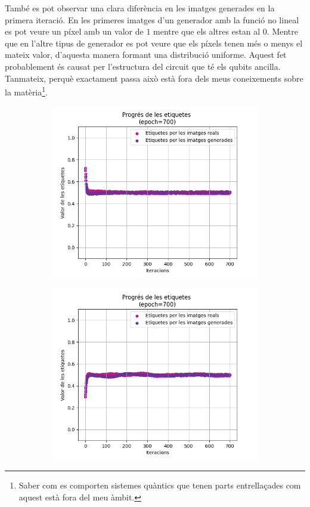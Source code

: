També es pot observar una clara diferència en les imatges generades en la primera iteració. En les primeres imatges d'un generador amb la funció no lineal es pot veure un píxel amb un valor de $1$ mentre que els altres estan al $0$. Mentre que en l'altre tipus de generador es pot veure que els píxels tenen més o menys el mateix valor, d'aquesta manera formant una distribució uniforme. Aquest fet probablement és causat per l'estructura del circuit que té els qubits ancilla. Tanmateix, perquè exactament passa això està fora dels meus coneixements sobre la matèria\footnote{Saber com es comporten sistemes quàntics que tenen parts entrellaçades com aquest està fora del meu àmbit.}.

\begin{figure}[H]
	\begin{subfigure}[b]{.32\linewidth}
		\includegraphics[width=\linewidth]{figures/data/L_4.png}
		\caption{}
	\end{subfigure}
	\begin{subfigure}[b]{.32\linewidth}
		\includegraphics[width=\linewidth]{figures/data/L_5.png}

\end{subfigure}
\end{figure}
